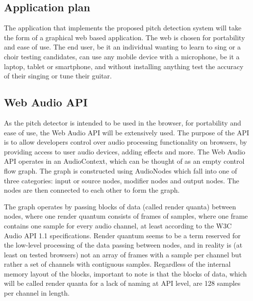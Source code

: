 \subsection{Application plan}
The application that implements the proposed pitch detection system will take the form of a graphical web based application. The web is chosen for portability and ease of use. The end user, be it an individual wanting to learn to sing or a choir testing candidates, can use any mobile device with a microphone, be it a laptop, tablet or smartphone, and without installing anything test the accuracy of their singing or tune their guitar.

\subsection{Web Audio API}
As the pitch detector is intended to be used in the browser, for portability and ease of use, the Web Audio API will be extensively used. The purpose of the API is to allow developers control over audio processing functionality on browsers, by providing access to user audio devices, adding effects and more. 
The Web Audio API operates in an AudioContext, which can be thought of as an empty control flow graph. The graph is constructed using AudioNodes which fall into one of three categories: input or source nodes, modifier nodes and output nodes. The nodes are then connected to each other to form the graph. 

The graph operates by passing blocks of data (called render quanta) between nodes, where one render quantum consists of frames of samples, where one frame contains one sample for every audio channel, at least according to the W3C Audio API 1.1 specifications. Render quantum seems to be a term reserved for the low-level processing of the data passing between nodes, and in reality is (at least on tested browsers) not an array of frames with a sample per channel but rather a set of channels with contiguous samples. Regardless of the internal memory layout of the blocks, important to note is that the blocks of data, which will be called render quanta for a lack of naming at API level, are 128 samples per channel in length.


